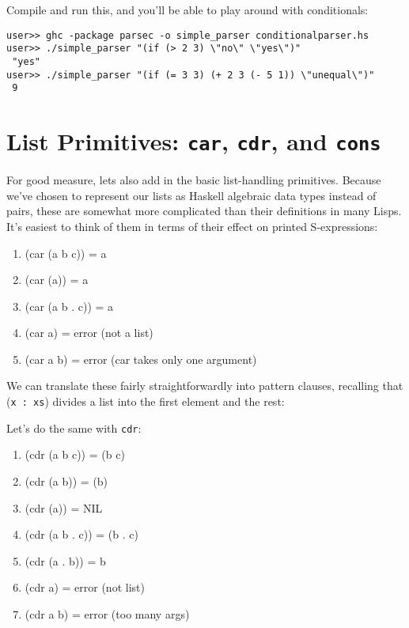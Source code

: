  
Compile and run this, and you'll be able to play around with conditionals:
 
\begin{lstlisting}[language=shell,numbers=none,nolol]
user>> ghc -package parsec -o simple_parser conditionalparser.hs
user>> ./simple_parser "(if (> 2 3) \"no\" \"yes\")"
 "yes"
user>> ./simple_parser "(if (= 3 3) (+ 2 3 (- 5 1)) \"unequal\")"
 9
\end{lstlisting}
 
\section{List Primitives: \texttt{car}, \texttt{cdr}, and \texttt{cons}}
 
For good measure, lets also add in the basic list-handling primitives. Because we've chosen to represent our lists as Haskell algebraic data types instead of pairs, these are somewhat more complicated than their definitions in many Lisps. It's easiest to think of them in terms of their effect on printed S-expressions:
 
\begin{enumerate}
	\item (car (a b c)) = a
	\item (car (a)) = a
	\item (car (a b . c)) = a
	\item (car a) = error (not a list)
	\item (car a b) = error (car takes only one argument)
\end{enumerate}
 
We can translate these fairly straightforwardly into pattern clauses, recalling that (\lstinline|x : xs|) divides a list into the first element and the rest:
 
 
Let's do the same with \verb|cdr|:
 
\begin{enumerate}
	\item (cdr (a b c)) = (b c)
	\item (cdr (a b)) = (b)
	\item (cdr (a)) = NIL
	\item (cdr (a b . c)) = (b . c)
	\item (cdr (a . b)) = b
	\item (cdr a) = error (not list)
	\item (cdr a b) = error (too many args)
\end{enumerate}
 

